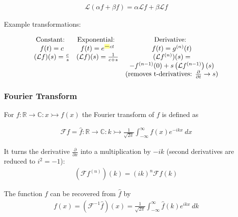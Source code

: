 \begin{align*}
	\mathcal{L}(\alpha f+\beta f)=\alpha\mathcal{L}f+\beta\mathcal{L}f
\end{align*}

Example transformations:
\begin{snugshade*}
    \begin{align*}
        \begin{matrix}
            \text{Constant: } & \text{Exponential: } & \text{Derivative: } \\
            f(t)=c & f(t)=e^{\emph{$-$}ct} & f(t)=g^{(n)}(t) \\
            (\mathcal{L}f)(s) = \frac{c}{s} & (\mathcal{L}f)(s) = \frac{1}{c+s} & (\mathcal{L}f^{(n)})(s)= \\
            & & -f^{(n-1)}(0)+s\left(\mathcal{L}f^{(n-1)}\right)(s) \\
            & & \text{(removes t-derivatives: }\frac{\partial}{\partial t}\rightarrow s\text{)}
        \end{matrix}
    \end{align*}
\end{snugshade*}


\subsubsection{Fourier Transform}

For $f : \mathbb{R}\to\mathbb{C} : x \rightarrowtail f(x)$ the Fourier transform of $f$ is defined as

\begin{align*}
    \mathcal{F}f = \hat{f} : \mathbb{R}\to\mathbb{C} : k\rightarrowtail
    \frac{1}{\sqrt{2\pi}}\int_{-\infty}^{\infty}f(x)e^{-ikx}\ dx
\end{align*}

It turns the derivative $\frac{\partial}{\partial x}$ into a multiplication by $-ik$ (second derivatives are reduced to $i^2=-1$):
\begin{align*}
	(\mathcal{F}f^{(n)})(k) = (ik)^n\mathcal{F}f(k)
\end{align*}

The function $f$ can be recovered from $\hat{f}$ by
\begin{align*}
    f(x)=(\mathcal{F}^{-1}\hat{f})(x)
    = \frac{1}{\sqrt{2\pi}}\int_{-\infty}^\infty \hat{f}(k) e^{ikx}\ dk
\end{align*}
